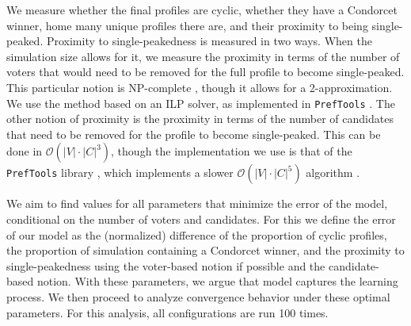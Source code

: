 We measure whether the final profiles are cyclic, whether they have a Condorcet
winner, home many unique profiles there are, and their proximity to being
single-peaked. Proximity to single-peakedness is measured in two ways. When the
simulation size allows for it, we measure the proximity in terms of the number
of voters that would need to be removed for the full profile to become
single-peaked. This particular notion is NP-complete
\cite{erdelyiComputationalAspectsNearly2013}, though it allows for a
2-approximation. We use the method based on an ILP solver, as implemented in
\texttt{PrefTools} \cite{PrefLibPreflibtools2025}. The other notion of proximity is the proximity in
terms of the number of candidates that need to be removed for the profile to
become single-peaked. This can be done in $\mathcal{O}(|V| \cdot{} |C|
^3)$\cite{przedmojskiAlgorithmsExperimentsNearly}, though the implementation we
use is that of the \texttt{PrefTools} library \cite{PrefLibPreflibtools2025}, which implements
a slower $\mathcal{O}(|V| \cdot{} |C|^5)$ algorithm
\cite{erdelyiComputationalAspectsNearly2013}. 




We aim to find values for all parameters that minimize the error of the model,
conditional on the number of voters and candidates. For this we define the
error of our model as the (normalized) difference of the proportion of cyclic
profiles, the proportion of simulation containing a Condorcet winner, and the
proximity to single-peakedness using the voter-based notion if possible and the
candidate-based notion. With these parameters, we argue that model captures the
learning process. We then proceed to analyze convergence behavior under these
optimal parameters. For this analysis, all configurations are run 100 times.


